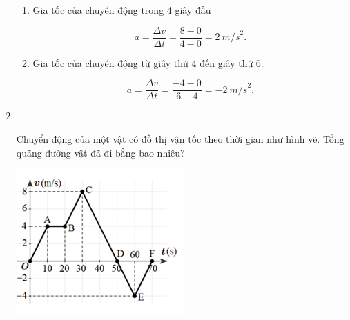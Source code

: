 \begin{enumerate}[label=\bfseries Bài \arabic*:,leftmargin=1.5cm]
{\begin{enumerate}[label=\alph*)]
\begin{itemize}
		Độ dịch chuyển bằng diện tích tam giác vuông có cạnh đáy là $t$ và chiều cao là $v$.
		
		$$d_2 = \dfrac{1}{2}v_2t_2 = -\SI{4}{m}.$$
		\item Trong 3 giây cuối:
		
		Độ dịch cuyển bằng diện tích hình chữ nhật có chiều dài là $t$ và chiều rộng là $v$.
		
		$$d_3 = \dfrac{1}{2}v_3t_3 = -\SI{12}{m}.$$
	\end{itemize}
\item Gia tốc của chuyển động trong 4 giây đầu

$$a = \dfrac{\Delta v}{\Delta t} =\dfrac{8 - 0}{4-0}= \SI{2}{m/s}^2.$$
\item Gia tốc của chuyển động từ giây thứ 4 đến giây thứ 6:

$$a = \dfrac{\Delta v}{\Delta t} =\dfrac{-4 - 0}{6-4}= -\SI{2}{m/s}^2.$$
		\end{enumerate}
		
	}
	
	\item {}\\
	{Chuyển động của một vật có đồ thị vận tốc theo thời gian như hình vẽ. Tổng quãng đường vật đã đi bằng bao nhiêu?
		\begin{center}
			\includegraphics[width=0.35\linewidth]{../figs/VN10-2022-PH-TP008-P-8}
		\end{center}
	
}


\end{enumerate}
